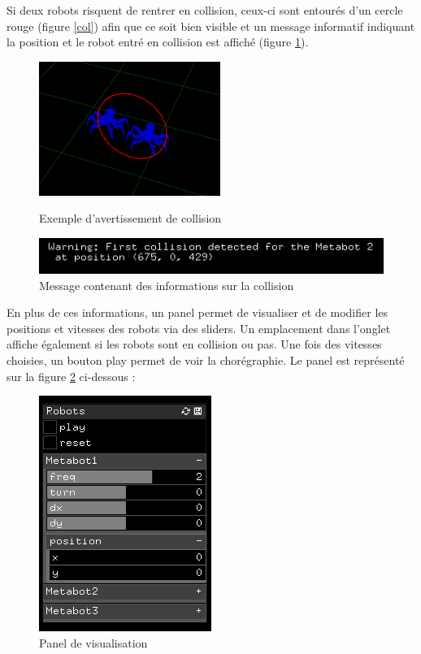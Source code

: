 Si deux robots risquent de rentrer en collision, ceux-ci sont entourés d'un cercle rouge (figure \ref{col}) afin que ce soit bien visible et un message informatif indiquant la position et le robot entré en collision est affiché (figure \ref{mcol}).

\begin{figure}[htbp]
\begin{minipage}[c]{.45\linewidth}
\begin{center}
\includegraphics[scale=0.6]{imgs/collision}
\caption{Exemple d'avertissement de collision}
\label{col}
\end{center}
\end{minipage}
\hfill
\begin{minipage}[c]{.45\linewidth}
\begin{center}
\includegraphics[scale=0.5]{imgs/mcollision}
\caption{Message contenant des informations sur la collision}
\label{mcol}
\end{center}
\end{minipage}
\end{figure}

En plus de ces informations, un panel permet de visualiser et de modifier les positions et vitesses des robots via des sliders. Un emplacement dans l'onglet affiche également si les robots sont en collision ou pas. Une fois des vitesses choisies, un bouton play permet de voir la chorégraphie. Le panel est représenté sur la figure \ref{pan} ci-dessous :

\begin{figure}[H]
\centering
\includegraphics[scale=0.5]{imgs/panel2}
\caption{Panel de visualisation}
\label{pan}
\end{figure}

